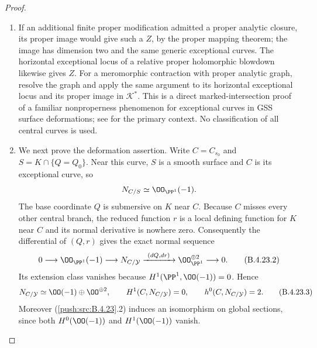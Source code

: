 \begin{proof}
\begin{enumerate}[label=\arabic*.,leftmargin=*]
\item If an additional finite proper modification admitted a
proper analytic closure, its proper image would give
such a $Z$, by the proper mapping theorem; the image has
dimension two and the same generic exceptional curves.
The horizontal exceptional locus of a relative proper
holomorphic blowdown likewise gives $Z$. For a meromorphic
contraction with proper analytic graph, resolve the graph
and apply the same argument to its horizontal exceptional
locus and its proper image in $\mathcal K^*$.
This is a direct marked-intersection proof of a familiar
nonproperness phenomenon for exceptional curves in GSS
surface deformations; see
\citet[Section 1.2]{DlousskyTeleman2012AB} for the primary
context. No classification of all central curves is used.

\item We next prove the deformation assertion. Write
$C=C_{s_0}$ and $S=K\cap\{Q=Q_0\}$. Near this curve,
$S$ is a smooth surface and $C$ is its exceptional curve,
so
\[
 N_{C/S}\simeq\OO_{\PP^1}(-1).
\]
The base coordinate $Q$ is submersive on $K$ near $C$.
Because $C$ misses every other central branch, the reduced
function $r$ is a local defining function for $K$ near
$C$ and its normal derivative is nowhere zero.
Consequently the differential of $(Q,r)$ gives the exact
normal sequence
\[
 0\longrightarrow\OO_{\PP^1}(-1)
 \longrightarrow N_{C/\mathcal Y}
 \xrightarrow{\ (dQ,dr)\ }
 \OO_{\PP^1}^{\oplus2}\longrightarrow0.
                                                        \tag{B.4.23.2}
\]
Its extension class vanishes because
$H^1(\PP^1,\OO(-1))=0$. Hence
\[
 N_{C/\mathcal Y}\simeq
 \OO(-1)\oplus\OO^{\oplus2},\qquad
 H^1(C,N_{C/\mathcal Y})=0,\qquad
 h^0(C,N_{C/\mathcal Y})=2.                             \tag{B.4.23.3}
\]
Moreover (\ref{push:src:B.4.23}.2) induces an isomorphism on global
sections, since both $H^0(\OO(-1))$ and $H^1(\OO(-1))$
vanish.


\end{enumerate}
\end{proof}
